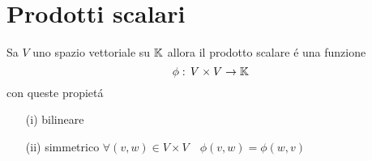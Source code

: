 %
%
 
\section{Prodotti scalari}
\begin{defn}\bianco
Sa $V$ uno spazio vettoriale su $\mathbb{K}$ allora il prodotto scalare \'e una funzione
$$ \phi:\, V \times V \to \mathbb{K} $$
con queste propiet\'a 
\begin{itemize}
\item[(i)]  bilineare 
\item[(ii)] simmetrico $ \forall (v,w) \in V \times V  \quad \phi(v,w) = \phi (w,v) $
\end{itemize}
\end{defn}

\spazio
